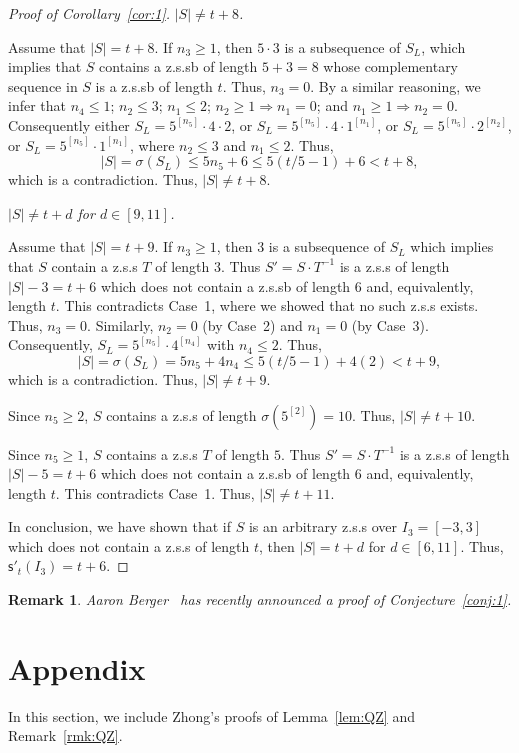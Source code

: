 \documentclass[12 pt]{amsart}
\newtheorem{remark}[theorem]{Remark}
\def \n{\noindent }
\def \bs{\bigskip}
\def \zs{z.s.s }
\def \zsb{z.s.s{\tiny b} }
\def \m{\mathsf{s}'}
\begin{document}
\begin{proof}[Proof of Corollary~\ref{cor:1}]
\bs\n {\bf Case 3:} {\em $|S|\not=t+8$.}

Assume that $|S|=t+8$. If ${n_3}\geq1$,
then $5\cdot 3$ is a subsequence of $S_L$, which 
implies that $S$ contains a \zsb of length $5+3=8$ 
whose complementary sequence in $S$ is a \zsb of length $t$. Thus,
${n_3}=0$. By a similar reasoning, we infer that ${n_4}\leq1$; 
${n_2}\leq 3$; ${n_1}\leq 2$; ${n_2}\geq1\Rightarrow {n_1}=0$; and ${n_1}\geq1\Rightarrow {n_2}=0$. Consequently either $S_L=5^{[n_5]}\cdot 4\cdot2$, or $S_L=5^{[n_5]}\cdot 4\cdot1^{[n_1]}$, or $S_L=5^{[n_5]}\cdot 2^{[n_2]}$, or $S_L=5^{[n_5]}\cdot1^{[n_1]}$, where ${n_2}\leq 3$ and $n_1\leq2$. Thus,
\[|S|=\sigma(S_L)\leq 5{n_5}+6\leq 5(t/5-1)+6<t+8,\]
which is a contradiction. Thus, $|S|\not=t+8$.

\bs\n {\bf Case 4:} {\em $|S|\not=t+d$ for $d\in[9,11]$.}

Assume that $|S|=t+9$. 
If ${n_3}\geq1$, then $3$ is a subsequence of $S_L$ which 
implies that $S$ contain a \zs $T$ of length $3$.
Thus $S'=S\cdot T^{-1}$ is a \zs of length $|S|-3=t+6$ 
which does not contain a \zsb of length $6$ and, equivalently,
length $t$. This contradicts Case~1, where we showed that no such 
\zs exists. Thus, ${n_3}=0$.  Similarly, $n_2=0$ (by Case~2) and $n_1=0$ (by Case~3). Consequently, $S_L=5^{[n_5]}\cdot 4^{[n_4]}$ with ${n_4}\leq 2$. 
Thus,
\[|S|=\sigma(S_L)=5{n_5}+4n_4\leq 5(t/5-1)+4(2)<t+9,\]
which is a contradiction. Thus, $|S|\not=t+9$.

Since $n_5\geq2$, $S$ contains a \zs of length $\sigma(5^{[2]})=10$. Thus, $|S|\not=t+10$.
 
Since $n_5\geq1$, $S$ contains a \zs $T$ of length $5$.
Thus $S'=S\cdot T^{-1}$ is a \zs of length $|S|-5=t+6$ 
which does not contain a \zsb of length $6$ and, equivalently, 
length $t$. This contradicts Case~1. Thus, $|S|\not=t+11$.

\bs In conclusion, we have shown that if $S$ is an arbitrary \zs over $I_3=[-3,3]$ which does not contain a \zs of length $t$, then
$|S|=t+d$ for $d\in[6,11]$. Thus, $\m_t(I_3)=t+6$.
\end{proof}
%
\begin{remark}
Aaron Berger~\cite{AB} has recently announced a proof of Conjecture~\ref{conj:1}.
\end{remark}
\section{Appendix}\label{sec:app}
In this section, we include Zhong's proofs of Lemma~\ref{lem:QZ} 
and Remark~\ref{rmk:QZ}.
\end{document}
